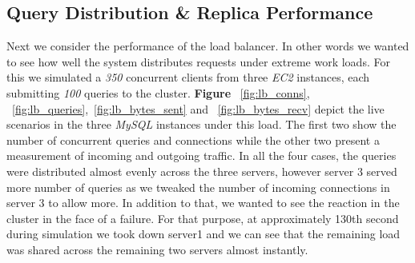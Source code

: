 \documentclass[12pt]{article}
\begin{document}
\subsection{Query Distribution \& Replica Performance}
Next we consider the performance of the load balancer. In other words we wanted to see how well the system distributes requests under extreme work loads. For this we simulated a \emph{350} concurrent clients from three \emph{EC2} instances, each submitting \emph{100} queries to the cluster. \textbf{Figure }~\ref{fig:lb_conns}, ~\ref{fig:lb_queries},~\ref{fig:lb_bytes_sent} and ~\ref{fig:lb_bytes_recv} depict the live scenarios in the three \emph{MySQL} instances under this load. The first two show the number of concurrent queries and connections while the other two present a measurement of incoming and outgoing traffic. In all the four cases, the queries were distributed almost evenly across the three servers, however server 3 served more number of queries as we tweaked the number of incoming connections in server 3 to allow more. In addition to that, we wanted to see the reaction in the cluster in the face of a failure. For that purpose, at approximately 130th second during simulation we took down server1 and we can see that the remaining load was shared across the remaining two servers almost instantly. 
\vspace{35mm}
\end{document}
